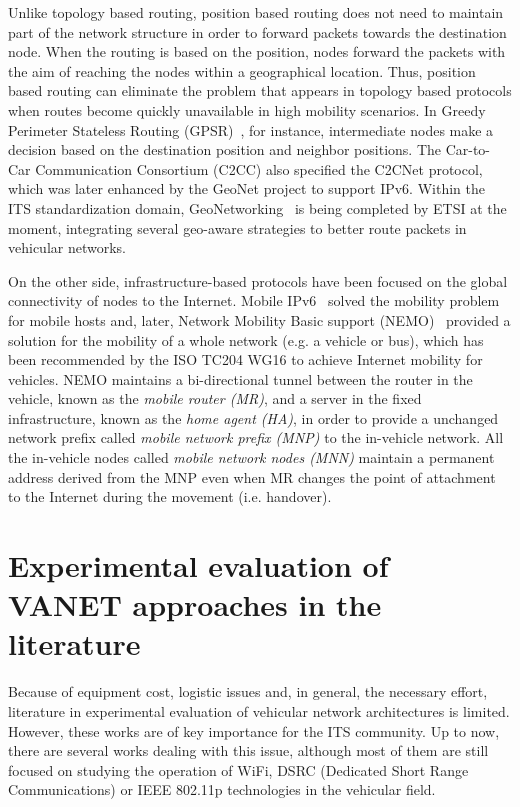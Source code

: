 \documentclass[fonts]{icst}
\begin{document}
Unlike topology based routing, position based routing does not need to maintain
part of the network structure in order to forward packets towards the
destination node. When the routing is based on the position, nodes forward the
packets with the aim of reaching the nodes within a geographical location. Thus,
position based routing can eliminate the problem that appears in topology based
protocols when routes become quickly unavailable in high mobility scenarios. In
Greedy Perimeter Stateless Routing (GPSR)~\cite{Karp2000}, for instance, 
intermediate nodes make a decision based on the destination position and
neighbor positions. The Car-to-Car Communication Consortium (C2CC) also
specified the C2CNet protocol, which was later enhanced by the GeoNet project to
support IPv6. Within the ITS standardization domain,
GeoNetworking~\cite{ETSI-TS-102-636-4-1-Media} is being completed by ETSI at the
moment, integrating several geo-aware strategies to better route packets in
vehicular networks.

On the other side, infrastructure-based protocols have been focused on the
global connectivity of nodes to the Internet. Mobile IPv6~\cite{rfc6275} solved
the mobility problem for mobile hosts and, later, Network Mobility Basic support
(NEMO)~\cite{rfc3963} provided a solution for the mobility of a whole network
(e.g. a vehicle or bus), which has been recommended by the ISO TC204 WG16 to
achieve Internet mobility for vehicles. NEMO maintains a bi-directional tunnel between the router in the vehicle, known as the \textit{mobile router (MR)}, and a server in the fixed infrastructure, known as the \textit{home agent (HA)}, in order to provide a unchanged network prefix called \textit{mobile network prefix (MNP)} to the in-vehicle network. All the in-vehicle nodes called \textit{mobile network nodes (MNN)} maintain a permanent address derived from the MNP even when MR changes the point of attachment to the Internet during the movement (i.e. handover).







\section{Experimental evaluation of VANET approaches in the literature}
\label{lbl:experimental}

Because of equipment cost, logistic issues and, in general, the necessary effort, literature in experimental evaluation of vehicular network architectures is limited. However, these works are of key importance for the ITS community. Up to now, there are several works dealing
with this issue, although most of them are still focused on studying the
operation of WiFi, DSRC (Dedicated Short Range Communications) or IEEE 802.11p technologies in the vehicular field.
\end{document}
